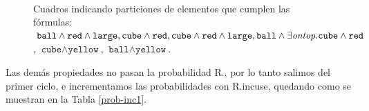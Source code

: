 \begin{figure}[h]
\begin{center}
\\[0pt]
\caption{Cuadros indicando particiones de elementos que cumplen las f\'ormulas: $\texttt{ball} \wedge \texttt{red} \wedge \texttt{large},\texttt{cube} \wedge \texttt{red}, \texttt{cube} \wedge \texttt{red} \wedge \texttt{large},\texttt{ball} \wedge \exists \mathit{ontop}. \texttt{cube} \wedge \texttt{red}$, $\texttt{cube} \wedge \texttt{yellow}$, $\texttt{ball} \wedge \texttt{yellow}$.}
\label{fig-modelo9d}
\end{center}
\end{figure}


Las dem\'as propiedades no pasan la probabilidad R.\randomuse, por lo tanto salimos del primer ciclo, e incrementamos las probabilidades con R.incuse, quedando como se muestran en la Tabla \ref{prob-inc1}.



